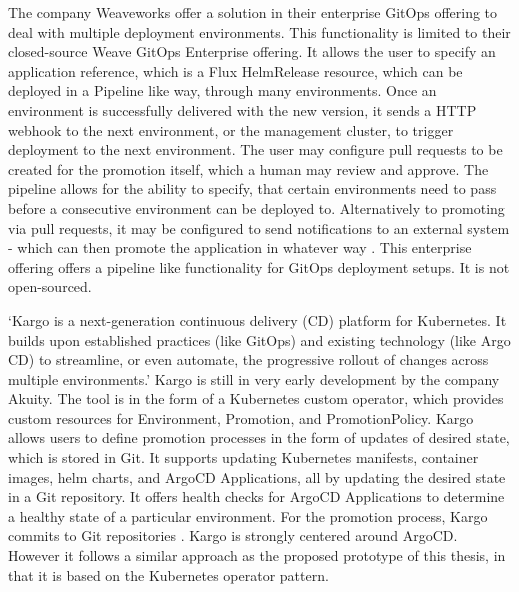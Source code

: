 The company Weaveworks
offer a solution in their enterprise GitOps offering
to deal with multiple deployment environments.
This functionality is limited to their closed-source Weave GitOps Enterprise offering.
It allows the user to specify an application reference,
which is a Flux HelmRelease resource,
which can be deployed in a Pipeline like way,
through many environments.
Once an environment is successfully delivered with the new version,
it sends a HTTP webhook to the next environment, or the management cluster,
to trigger deployment to the next environment.
The user may configure pull requests to be created for the promotion itself,
which a human may review and approve.
The pipeline allows for the ability to specify, that certain environments need
to pass before a consecutive environment can be deployed to.
Alternatively to promoting via pull requests,
it may be configured to send notifications
to an external system -
which can then promote the application in whatever way
\autocite{weaveGitOpsPipelines}.
%
This enterprise offering offers a pipeline like functionality
for GitOps deployment setups. It is not open-sourced.


\enquote*{Kargo is a next-generation continuous delivery (CD) platform for Kubernetes. It builds upon established practices (like GitOps) and existing technology (like Argo CD) to streamline, or even automate, the progressive rollout of changes across multiple environments.}
\autocite{kargoAkuityWebsite}
Kargo is still in very early development by the company Akuity.
The tool is in the form of a Kubernetes custom operator, which provides custom resources
for Environment, Promotion, and PromotionPolicy.
Kargo allows users to define promotion processes in the form of updates of desired state,
which is stored in Git. It supports updating Kubernetes manifests, container images, helm charts,
and ArgoCD Applications, all by updating the desired state in a Git repository.
It offers health checks for ArgoCD Applications to determine a healthy state of a particular environment.
For the promotion process, Kargo commits to Git repositories
\autocite{kargoAkuityWebsite}.
Kargo is strongly centered around ArgoCD. However
it follows a similar approach as the proposed prototype of this thesis,
in that it is based on the Kubernetes operator pattern.

